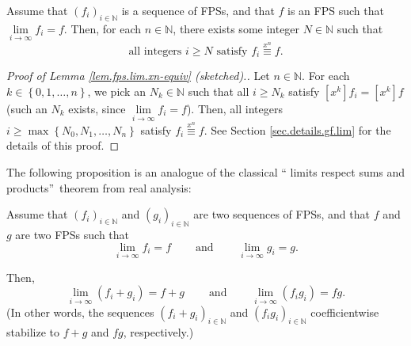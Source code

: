 \begin{lemma}
\label{lem.fps.lim.xn-equiv}Assume that $\left(  f_{i}\right)  _{i\in
\mathbb{N}}$ is a sequence of FPSs, and that $f$ is an FPS such that
$\lim\limits_{i\rightarrow\infty}f_{i}=f$. Then, for each $n\in\mathbb{N}$,
there exists some integer $N\in\mathbb{N}$ such that
\[
\text{all integers }i\geq N\text{ satisfy }f_{i}\overset{x^{n}}{\equiv}f.
\]

\end{lemma}

\begin{proof}
[Proof of Lemma \ref{lem.fps.lim.xn-equiv} (sketched).]Let $n\in\mathbb{N}$.
For each $k\in\left\{  0,1,\ldots,n\right\}  $, we pick an $N_{k}\in
\mathbb{N}$ such that all $i\geq N_{k}$ satisfy $\left[  x^{k}\right]
f_{i}=\left[  x^{k}\right]  f$ (such an $N_{k}$ exists, since $\lim
\limits_{i\rightarrow\infty}f_{i}=f$). Then, all integers $i\geq\max\left\{
N_{0},N_{1},\ldots,N_{n}\right\}  $ satisfy $f_{i}\overset{x^{n}}{\equiv}f$.
See Section \ref{sec.details.gf.lim} for the details of this proof.
\end{proof}

The following proposition is an analogue of the classical \textquotedblleft
limits respect sums and products\textquotedblright\ theorem from real analysis:

\begin{proposition}
\label{prop.fps.lim.sum-prod}Assume that $\left(  f_{i}\right)  _{i\in
\mathbb{N}}$ and $\left(  g_{i}\right)  _{i\in\mathbb{N}}$ are two sequences
of FPSs, and that $f$ and $g$ are two FPSs such that%
\[
\lim\limits_{i\rightarrow\infty}f_{i}=f\ \ \ \ \ \ \ \ \ \ \text{and}%
\ \ \ \ \ \ \ \ \ \ \lim\limits_{i\rightarrow\infty}g_{i}=g.
\]


Then,
\[
\lim\limits_{i\rightarrow\infty}\left(  f_{i}+g_{i}\right)
=f+g\ \ \ \ \ \ \ \ \ \ \text{and}\ \ \ \ \ \ \ \ \ \ \lim
\limits_{i\rightarrow\infty}\left(  f_{i}g_{i}\right)  =fg.
\]
(In other words, the sequences $\left(  f_{i}+g_{i}\right)  _{i\in\mathbb{N}}$
and $\left(  f_{i}g_{i}\right)  _{i\in\mathbb{N}}$ coefficientwise stabilize
to $f+g$ and $fg$, respectively.)
\end{proposition}

